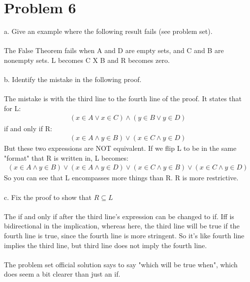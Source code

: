 \documentclass{article}
\begin{document}
\section{Problem 6}
a. Give an example where the following result fails (see problem set).
\\
\\
The False Theorem fails when A and D are empty sets, and C and B are nonempty sets. L becomes C X B and R becomes zero.
\\\\
b. Identify the mistake in the following proof.
\\
\\
The mistake is with the third line to the fourth line of the proof. It states that for L:
\begin {align*}
(x \in A \vee x \in C) \wedge (y \in B \vee y \in D)
\end {align*}
if and only if R:
\begin {align*}
(x \in A \wedge y \in B) \vee (x \in C \wedge y \in D)
\end {align*}
But these two expressions are NOT equivalent. If we flip L to be in the same "format" that R is written in, L becomes:
\begin {align*}
(x \in A \wedge y \in B) \vee (x \in A \wedge y \in D) \vee (x \in C \wedge y \in B) \vee (x \in C \wedge y \in D)
\end {align*}
So you can see that L encompasses more things than R. R is more restrictive. 
\\\\
c. Fix the proof to show that $R \subseteq L$
\\
\\
The if and only if after the third line's expression can be changed to if. Iff is bidirectional in the implication, whereas here, the third line will be true if the fourth line is true, since the fourth line is more stringent. So it's like fourth line implies the third line, but third line does not imply the fourth line. 
\\\\
The problem set official solution says to say "which will be true when", which does seem a bit clearer than just an if. 
\end{document}
